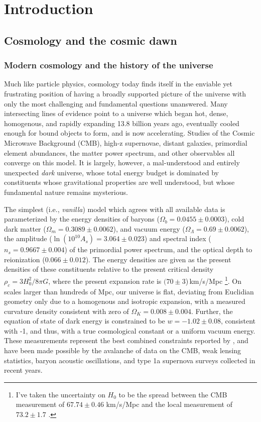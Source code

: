 \chapter{Introduction}


\section{Cosmology and the cosmic dawn}

\subsection{Modern cosmology and the history of the universe}

Much like particle physics, cosmology today finds itself in the enviable yet frustrating position of having a broadly supported picture of the universe with only the most challenging and fundamental questions unanswered. Many intersecting lines of evidence point to a universe which began hot, dense, homogenous, and rapidly expanding 13.8 billion years ago, eventually cooled enough for bound objects to form, and is now accelerating. Studies of the Cosmic Microwave Background (CMB), high-z supernovae, distant galaxies, primordial element abundances, the matter power spectrum, and other observables all converge on this model. It is largely, however, a mal-understood and entirely unexpected \textit{dark} universe, whose total energy budget is dominated by constituents whose gravitational properties are well understood, but whose fundamental nature remains mysterious. 

The simplest (i.e., \textit{vanilla}) model which agrees with all available data is parameterized by the energy densities of baryons ($\Omega_b=0.0455\pm0.0003$), cold dark matter  ($\Omega_m=0.3089\pm0.0062$), and vacuum energy ($\Omega_\Lambda=0.69\pm0.0062$), the amplitude ($\ln (10^{10}A_s)=3.064\pm0.023$) and spectral index ($n_s=0.9667\pm0.004$) of the primordial power spectrum, and the optical depth to reionization ($0.066\pm0.012$). 
The energy densities are given as the present densities of these constituents relative to the present critical density $\rho_c=3H_0^2/8\pi G$, where the present expansion rate is $(70\pm3$)\,km/s/Mpc
\footnote{I've taken the uncertainty on $H_0$ to be the spread between the CMB measurement of $67.74\pm0.46$ km/s/Mpc \citep{planck16} and the local measurement of $73.2\pm1.7$ \citep{reiss16}.}. 
On scales larger than hundreds of Mpc, our universe is flat, deviating from Euclidian geometry only due to a homogenous and isotropic expansion, with a measured curvature density consistent with zero of $\Omega_K=0.008\pm0.004$. 
Further, the equation of state of dark energy is constrained to be $w=-1.02\pm0.08$, consistent with -1, and thus, with a true cosmological constant or a uniform vacuum energy. These measurements represent the best combined constraints reported by \citet{planck16}, and have been made possible by the avalanche of data on the CMB, weak lensing statistics, baryon acoustic oscillations, and type 1a supernova surveys collected in recent years. 

